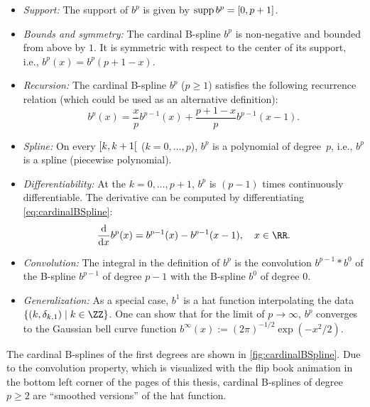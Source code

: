 \begin{itemize}
  \item
  \emph{Support:}
  The support of $b^p$ is given by $\operatorname{supp} b^p = [0, p + 1]$.
  
  \item
  \emph{Bounds and symmetry:}
  The cardinal B-spline $b^p$ is non-negative and bounded from above by $1$.
  It is symmetric with respect to the center of its support, i.e.,
  $b^p(x) = b^p(p + 1 - x)$.
  
  \item
  \emph{Recursion:}
  The cardinal B-spline $b^p$ ($p \ge 1$) satisfies the following recurrence
  relation
  (which could be used as an alternative definition):
  \begin{equation}
    b^p(x)
    = \frac{x}{p} b^{p-1}(x) + \frac{p+1-x}{p} b^{p-1}(x-1).
  \end{equation}
  
  \item
  \emph{Spline:}
  On every  $\mathopen[k, k+1\mathclose[$
  ($k = 0, \dotsc, p$), $b^p$ is a polynomial of degree~$p$, i.e.,
  $b^p$ is a spline (piecewise polynomial).
  
  \item
  \emph{Differentiability:}
  At the  $k = 0, \dotsc, p + 1$,
  $b^p$ is $(p - 1)$ times continuously differentiable.
  The derivative can be computed by differentiating
  \eqref{eq:cardinalBSpline}:
  \begin{equation}
    \label{eq:cardinalBSplineDerivative}
    \frac{\diff}{\dx} b^p(x)
    = b^{p-1}(x) - b^{p-1}(x-1),\quad
    x \in \RR.
  \end{equation}
  
  \item
  \emph{Convolution:}
  The integral in the definition of $b^p$
  is the convolution $b^{p-1} \ast b^0$ of the B-spline $b^{p-1}$
  of degree $p - 1$ with the B-spline $b^0$ of degree $0$.
  
  \item
  \emph{Generalization:}
  As a special case, $b^1$ is a hat function interpolating the data
  $\{(k, \delta_{k,1}) \mid k \in \ZZ\}$.
  One can show that for the limit of $p \to \infty$,
  $b^p$ converges to the Gaussian bell curve function
  $b^\infty(x) := (2\pi)^{-1/2} \exp(-x^2/2)$.
\end{itemize}
The cardinal B-splines of the first degrees are shown in
\cref{fig:cardinalBSpline}.
Due to the convolution property,
which is visualized with the flip book animation in the bottom left corner
of the pages of this thesis,
cardinal B-splines of degree $p \ge 2$ are ``smoothed versions''
of the hat function.

